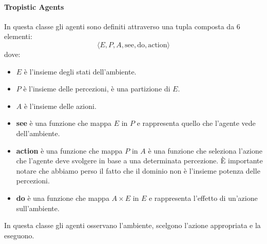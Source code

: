 \paragraph{Tropistic Agents}
In questa classe gli agenti sono definiti attraverso una tupla composta da 6
elementi:
\begin{equation*}
    \langle E, P, A, \text{see}, \text{do}, \text{action} \rangle
\end{equation*}
dove:
\begin{itemize}
    \item $E$ è l'insieme degli stati dell'ambiente.
    \item $P$ è l'insieme delle percezioni, è una partizione di $E$.
    \item $A$ è l'insieme delle azioni.
    \item \textbf{see} è una funzione che mappa $E$ in $P$ e rappresenta quello
          che l'agente vede dell'ambiente.
    \item \textbf{action} è una funzione che mappa $P$ in $A$ è una funzione che
          seleziona l'azione che l'agente deve svolgere in base a una determinata
          percezione. È importante notare che abbiamo perso il fatto che il
          dominio non è l'insieme potenza delle percezioni.
    \item \textbf{do} è una funzione che mappa $A \times E$ in $E$ e rappresenta
          l'effetto di un'azione sull'ambiente.
\end{itemize}

In questa classe gli agenti osservano l'ambiente, scelgono l'azione appropriata
e la eseguono.
